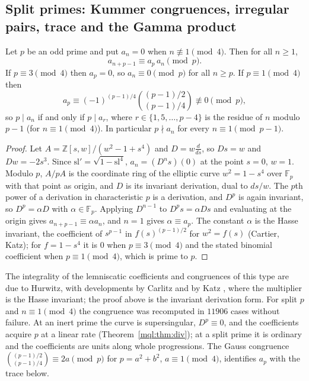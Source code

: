 \subsection{Split primes: Kummer congruences, irregular pairs, trace and the Gamma product}\label{mql:sub:split}

\begin{theorem}\label{mql:thm:kummer}
Let $p$ be an odd prime and put $a_n=0$ when $n\not\equiv1\pmod4$. Then for all $n\ge1$,
\[
a_{n+p-1}\equiv a_p\,a_n\pmod p .
\]
If $p\equiv3\pmod4$ then $a_p=0$, so $a_n\equiv0\pmod p$ for all $n\ge p$. If $p\equiv1\pmod4$ then
\[
a_p\equiv(-1)^{(p-1)/4}\binom{(p-1)/2}{(p-1)/4}\not\equiv0\pmod p ,
\]
so $p\mid a_n$ if and only if $p\mid a_r$, where $r\in\{1,5,\dots,p-4\}$ is the residue of $n$ modulo $p-1$ (for $n\equiv1\pmod 4$). In particular $p\nmid a_n$ for every $n\equiv1\pmod{p-1}$.
\end{theorem}

\begin{proof}
Let $A=\mathbb Z[s,w]/(w^2-1+s^4)$ and $D=w\frac{d}{ds}$, so $Ds=w$ and $Dw=-2s^3$. Since $\mathrm{sl}'=\sqrt{1-\mathrm{sl}^4}$, $a_n=(D^ns)(0)$ at the point $s=0$, $w=1$. Modulo $p$, $A/pA$ is the coordinate ring of the elliptic curve $w^2=1-s^4$ over $\mathbb F_p$ with that point as origin, and $D$ is its invariant derivation, dual to $ds/w$. The $p$th power of a derivation in characteristic $p$ is a derivation, and $D^p$ is again invariant, so $D^p=\alpha D$ with $\alpha\in\mathbb F_p$. Applying $D^{n-1}$ to $D^ps=\alpha Ds$ and evaluating at the origin gives $a_{n+p-1}\equiv\alpha a_n$, and $n=1$ gives $\alpha\equiv a_p$. The constant $\alpha$ is the Hasse invariant, the coefficient of $s^{p-1}$ in $f(s)^{(p-1)/2}$ for $w^2=f(s)$ (Cartier, Katz); for $f=1-s^4$ it is $0$ when $p\equiv3\pmod4$ and the stated binomial coefficient when $p\equiv1\pmod4$, which is prime to $p$.
\end{proof}

The integrality of the lemniscatic coefficients and congruences of this type are due to Hurwitz, with developments by Carlitz and by Katz \cite{Katz75}, where the multiplier is the Hasse invariant; the proof above is the invariant derivation form. For split $p$ and $n\equiv1\pmod4$ the congruence was recomputed in $11906$ cases without failure. At an inert prime the curve is supersingular, $D^p\equiv0$, and the coefficients acquire $p$ at a linear rate (Theorem~\ref{mql:thm:div}); at a split prime it is ordinary and the coefficients are units along whole progressions. The Gauss congruence $\binom{(p-1)/2}{(p-1)/4}\equiv2a\pmod p$ for $p=a^2+b^2$, $a\equiv1\pmod4$, identifies $a_p$ with the trace below.

